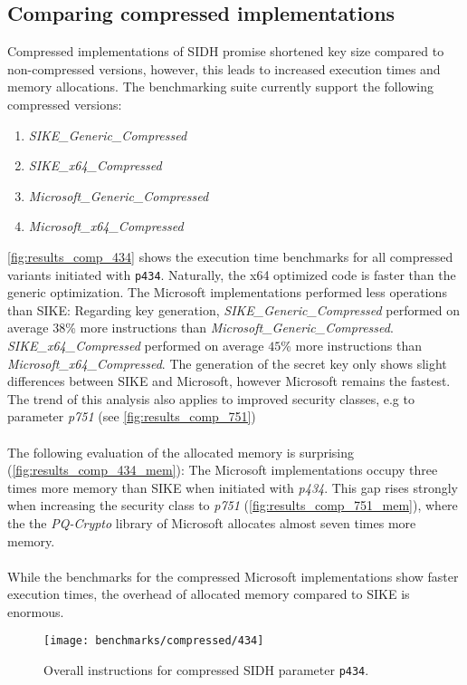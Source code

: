 \subsection{Comparing compressed implementations}\label{sec:analysis_compressed}
Compressed implementations of SIDH promise shortened key size compared to non-compressed versions, however, this leads to increased execution times and memory allocations. The benchmarking suite currently support the following compressed versions:
\begin{enumerate}
\item \textit{SIKE\_Generic\_Compressed}
\item \textit{SIKE\_x64\_Compressed}
\item \textit{Microsoft\_Generic\_Compressed}
\item \textit{Microsoft\_x64\_Compressed}
\end{enumerate}
\autoref{fig:results_comp_434} shows the execution time benchmarks for all compressed variants initiated with \texttt{p434}. Naturally, the x64 optimized code is faster than the generic optimization. The Microsoft implementations performed less operations than SIKE: Regarding key generation, \textit{SIKE\_Generic\_Compressed} performed on average $38$\% more instructions than \textit{Microsoft\_Generic\_Compressed}. \textit{SIKE\_x64\_Compressed} performed on average $45$\% more instructions than \textit{Microsoft\_x64\_Compressed}. The generation of the secret key only shows slight differences between SIKE and Microsoft, however Microsoft remains the fastest. The trend of this analysis also applies to improved security classes, e.g to parameter \textit{p751} (see \autoref{fig:results_comp_751})
\\\\
The following evaluation of the allocated memory is surprising (\autoref{fig:results_comp_434_mem}): The Microsoft implementations occupy three times more memory than SIKE when initiated with \textit{p434}. This gap rises strongly when increasing the security class to \textit{p751} (\autoref{fig:results_comp_751_mem}), where the the \textit{PQ-Crypto} library of Microsoft allocates almost seven times more memory.
\\\\
While the benchmarks for the compressed Microsoft implementations show faster execution times, the overhead of allocated memory compared to SIKE is enormous.

\begin{figure}[H]
  \centering
  \texttt{[image: benchmarks/compressed/434]}
  \caption[Overall instructions compressed p434]
  {Overall instructions for compressed SIDH parameter \texttt{p434}.}
  \label{fig:results_comp_434}
\end{figure}

